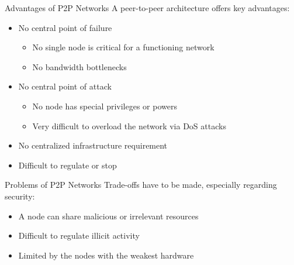 \documentclass[handout]{beamer}
\begin{document}
\begin{frame}{Advantages of P2P Networks}
	A peer-to-peer architecture offers key advantages:
	\vspace{0.3 cm}
	\begin{itemize}
		\item No central point of failure
		\begin{itemize}
			\item No single node is critical for a functioning network
			\item No bandwidth bottlenecks
		\end{itemize}
		\vspace{0.3 cm}
		\item<2-> No central point of attack
			\begin{itemize}
				\item No node has special privileges or powers
				\item Very difficult to overload the network via DoS attacks
			\end{itemize}	
		\vspace{0.3 cm}
		\item<3-> No centralized infrastructure requirement
		\vspace{0.3 cm}
		\item<4-> Difficult to regulate or stop
	\end{itemize}
	
\end{frame}

\begin{frame}{Problems of P2P Networks}
	Trade-offs have to be made, especially regarding security:
	\vspace{0.3 cm}
	\begin{itemize}
		\item A node can share malicious or irrelevant resources
		\vspace{0.3 cm}
		\item<2-> Difficult to regulate illicit activity
		\vspace{0.3 cm}
		\item<3-> Limited by the nodes with the weakest hardware
	\end{itemize}
	
\end{frame}
\end{document}
